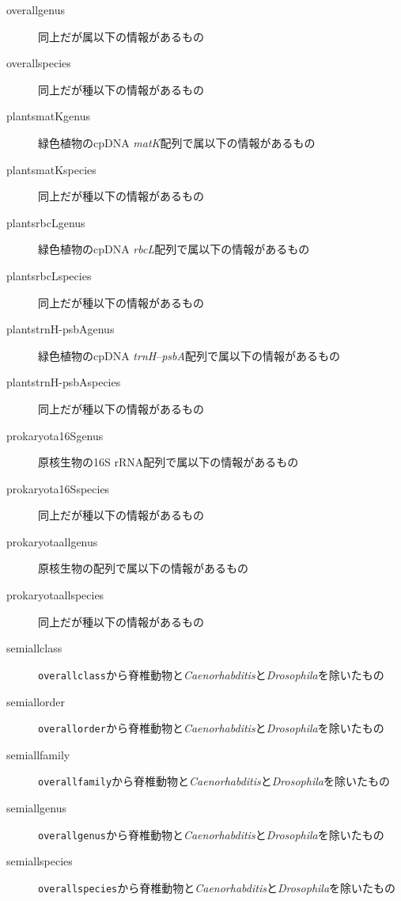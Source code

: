\documentclass[titlepage,10pt,a4paper]{jsbook}
\begin{document}
\begin{description}
\item[overall{\textunderscore}genus] 同上だが属以下の情報があるもの
\item[overall{\textunderscore}species] 同上だが種以下の情報があるもの
\item[plants{\textunderscore}matK{\textunderscore}genus] 緑色植物のcpDNA \textit{matK}配列で属以下の情報があるもの
\item[plants{\textunderscore}matK{\textunderscore}species] 同上だが種以下の情報があるもの
\item[plants{\textunderscore}rbcL{\textunderscore}genus] 緑色植物のcpDNA \textit{rbcL}配列で属以下の情報があるもの
\item[plants{\textunderscore}rbcL{\textunderscore}species] 同上だが種以下の情報があるもの
\item[plants{\textunderscore}trnH-psbA{\textunderscore}genus] 緑色植物のcpDNA \textit{trnH}--\textit{psbA}配列で属以下の情報があるもの
\item[plants{\textunderscore}trnH-psbA{\textunderscore}species] 同上だが種以下の情報があるもの
\item[prokaryota{\textunderscore}16S{\textunderscore}genus] 原核生物の16S rRNA配列で属以下の情報があるもの
\item[prokaryota{\textunderscore}16S{\textunderscore}species] 同上だが種以下の情報があるもの
\item[prokaryota{\textunderscore}all{\textunderscore}genus] 原核生物の配列で属以下の情報があるもの
\item[prokaryota{\textunderscore}all{\textunderscore}species] 同上だが種以下の情報があるもの
\item[semiall{\textunderscore}class] \texttt{overall{\textunderscore}class}から脊椎動物と\textit{Caenorhabditis}と\textit{Drosophila}を除いたもの
\item[semiall{\textunderscore}order] \texttt{overall{\textunderscore}order}から脊椎動物と\textit{Caenorhabditis}と\textit{Drosophila}を除いたもの
\item[semiall{\textunderscore}family] \texttt{overall{\textunderscore}family}から脊椎動物と\textit{Caenorhabditis}と\textit{Drosophila}を除いたもの
\item[semiall{\textunderscore}genus] \texttt{overall{\textunderscore}genus}から脊椎動物と\textit{Caenorhabditis}と\textit{Drosophila}を除いたもの
\item[semiall{\textunderscore}species] \texttt{overall{\textunderscore}species}から脊椎動物と\textit{Caenorhabditis}と\textit{Drosophila}を除いたもの
\end{description}
\end{document}

